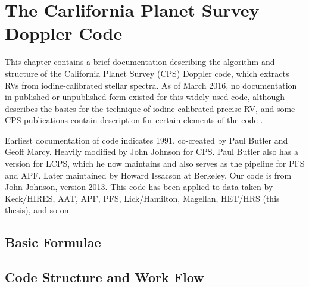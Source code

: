 \chapter{The Carlifornia Planet Survey Doppler Code}\label{chap:doppler}

This chapter contains a brief documentation describing the algorithm
and structure of the California Planet Survey (CPS) Doppler code,
which extracts RVs from iodine-calibrated stellar spectra. As of March
2016, no documentation in published or unpublished form existed for
this widely used code, although \cite{butler1996} describes the basics
for the technique of iodine-calibrated precise RV, and some CPS
publications contain description for certain elements of the code
\citep[e.g.,][]{ 2009ApJ...696...75H, 2011ApJ...726...73H,
  2011ApJS..197...26J}.

Earliest documentation of code indicates 1991, co-created by Paul
Butler and Geoff Marcy. Heavily modified by John Johnson for CPS. Paul
Butler also has a version for LCPS, which he now maintains and also
serves as the pipeline for PFS and APF. Later maintained by Howard
Issacson at Berkeley. Our code is from John Johnson, version
2013. This code has been applied to data taken by Keck/HIRES, AAT,
APF, PFS, Lick/Hamilton, Magellan, HET/HRS (this thesis), and so on.

\section{Basic Formulae}


\section{Code Structure and Work Flow}
